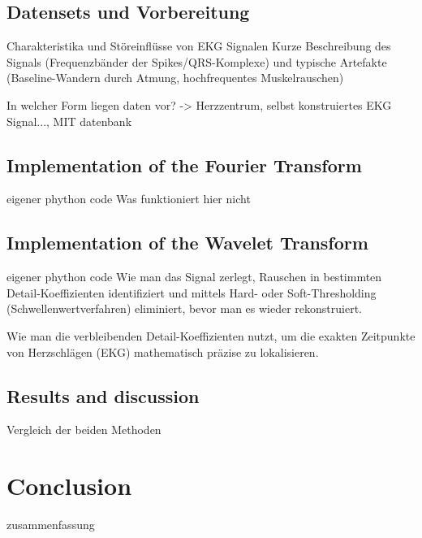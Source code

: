 \documentclass[a4paper,11pt,bibliography=totoc,listof=totoc,headinclude=true,cleardoublepage=empty,oneside]{scrbook}
\theoremstyle{definition}
\theoremstyle{remark}
\begin{document}
\section{Datensets und Vorbereitung}

Charakteristika und Störeinflüsse von EKG Signalen
Kurze Beschreibung des Signals (Frequenzbänder der Spikes/QRS-Komplexe)
und typische Artefakte (Baseline-Wandern durch Atmung, hochfrequentes Muskelrauschen)

In welcher Form liegen daten vor? -> Herzzentrum, selbst konstruiertes EKG Signal..., MIT datenbank 

\section{Implementation of the Fourier Transform}
eigener phython code 
Was funktioniert hier nicht

\section{Implementation of the Wavelet Transform}
eigener phython code
Wie man das Signal zerlegt, Rauschen in bestimmten Detail-Koeffizienten identifiziert 
und mittels Hard- oder Soft-Thresholding (Schwellenwertverfahren) eliminiert, bevor man es wieder rekonstruiert.

Wie man die verbleibenden Detail-Koeffizienten nutzt, um die exakten Zeitpunkte von Herzschlägen (EKG) mathematisch
präzise zu lokalisieren.

\section{Results and discussion}

Vergleich der beiden Methoden

\chapter{Conclusion}

zusammenfassung


%

\end{document}
